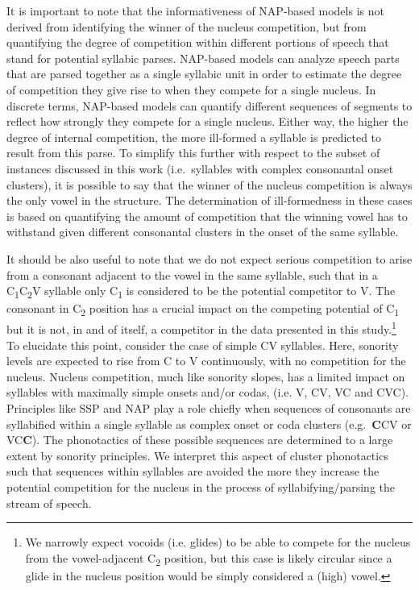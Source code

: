 It is important to note that the informativeness of NAP-based models is not derived from identifying the winner of the nucleus competition, but from quantifying the degree of competition within different portions of speech that stand for potential syllabic parses.
NAP-based models can analyze speech parts that are parsed together as a single syllabic unit in order to estimate the degree of competition they give rise to when they compete for a single nucleus.
In discrete terms, NAP-based models can quantify different sequences of segments to reflect how strongly they compete for a single nucleus.
Either way, the higher the degree of internal competition, the more ill-formed a syllable is predicted to result from this parse.
To simplify this further with respect to the subset of instances discussed in this work (i.e.~syllables with complex consonantal onset clusters), it is possible to say that the winner of the nucleus competition is always the only vowel in the structure. The determination of ill-formedness in these cases is based on quantifying the amount of competition that the winning vowel has to withstand given different consonantal clusters in the onset of the same syllable.

It should be also useful to note that we do not expect serious competition to arise from a consonant adjacent to the vowel in the same syllable, such that in a C\textsubscript{1}C\textsubscript{2}V syllable only C\textsubscript{1} is considered to be the potential competitor to V. The consonant in C\textsubscript{2} position has a crucial impact on the competing potential of C\textsubscript{1} but it is not, in and of itself, a competitor in the data presented in this study.\footnote{We narrowly expect vocoids (i.e. glides) to be able to compete for the nucleus from the vowel-adjacent C\textsubscript{2} position, but this case is likely circular since a glide in the nucleus position would be simply considered a (high) vowel.}
To elucidate this point, consider the case of simple CV syllables. Here, sonority levels are expected to rise from C to V
continuously, with no competition for the nucleus.
Nucleus competition, much like sonority slopes, has a limited impact on syllables with maximally simple onsets and/or codas, (i.e. V, CV, VC and CVC). Principles like SSP and NAP play a role chiefly when sequences of consonants are syllabified within a single syllable as complex onset or coda clusters (e.g.~\textbf{C}CV or VC\textbf{C}). The phonotactics of these possible sequences are determined to a large extent by sonority principles. We interpret this aspect of cluster phonotactics such that sequences within syllables are avoided the more they increase the potential competition for the nucleus in the process of syllabifying/parsing the stream of speech.

